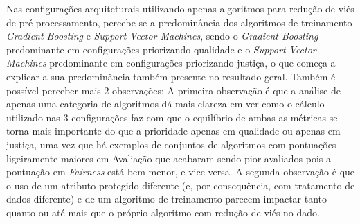 \documentclass[Portugues,Final]{ic-tese-v3}
\begin{document}
Nas configurações arquiteturais utilizando apenas algoritmos para redução de viés de pré-processamento, percebe-se a predominância dos algoritmos de treinamento \textit{Gradient Boosting} e \textit{Support Vector Machines}, sendo o \textit{Gradient Boosting} predominante em configurações priorizando qualidade e o \textit{Support Vector Machines} predominante em configurações priorizando justiça, o que começa a explicar a sua predominância também presente no resultado geral. Também é possível perceber mais 2 observações: A primeira observação é que a análise de apenas uma categoria de algoritmos dá mais clareza em ver como o cálculo utilizado nas 3 configurações faz com que o equilíbrio de ambas as métricas se torna mais importante do que a prioridade apenas em qualidade ou apenas em justiça, uma vez que há exemplos de conjuntos de algoritmos com pontuações ligeiramente maiores em Avaliação que acabaram sendo pior avaliados pois a pontuação em \textit{Fairness} está bem menor, e vice-versa. A segunda observação é que o uso de um atributo protegido diferente (e, por consequência, com tratamento de dados diferente) e de um algoritmo de treinamento parecem impactar tanto quanto ou até mais que o próprio algoritmo com redução de viés no dado.

\begin{table}[H]
\begin{center}
  \caption{Melhores configurações escolhidas pelo Gerenciador Autonômico \\ Algoritmos para redução de viés de processamento - 50\% Avaliação/50\% \textit{Fairness}}
\label{tbl:ScoreMAPEKInproc5050}
\end{center}
\end{table}
\end{document}
